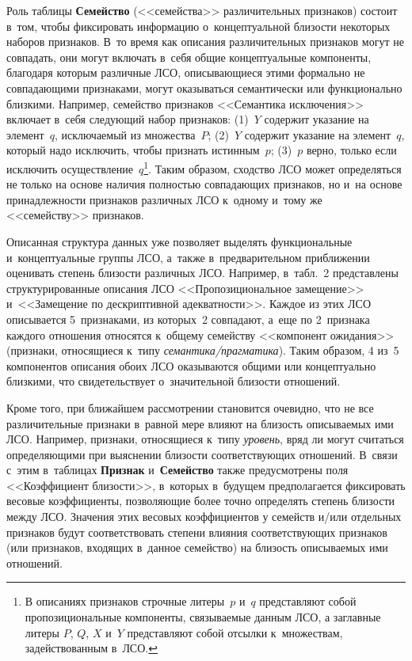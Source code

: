 \begin{multicols}{2}
Роль таблицы \textbf{Семейство} (<<семейства>> различительных признаков) 
состоит в~том, чтобы фиксировать информацию о~концептуальной бли\-зости 
некоторых наборов признаков. В~то время как \mbox{описания} различительных 
признаков могут не совпадать, они могут вклю\-чать в~себя общие 
концептуальные компоненты, благодаря которым различные ЛСО, 
описывающиеся этими формально не совпадающими признаками, могут 
оказываться семантически или функционально близкими. Например, 
семейство признаков <<Семантика исключения>> включает в~себя 
следующий набор признаков: 
(1)~$Y$ содержит указание на элемент~$q$, 
ис\-клю\-ча\-емый из множества~$P$; 
(2)~$Y$ содержит указание на элемент~$q$, 
который надо исключить, чтобы признать истинным~$p$; 
(3)~$p$ верно, 
только если исключить осуществление~$q$\footnote{В описаниях признаков 
строчные литеры~$p$ и~$q$ представляют собой пропозициональные компоненты, 
связываемые данным ЛСО, а заглавные литеры $P$, $Q$, $X$ и~$Y$ представляют 
собой отсылки к~множествам, задействованным в~ЛСО.}.
 Таким образом, сходство ЛСО может 
определяться не только на основе наличия пол\-ностью совпадающих 
признаков, но и~на основе принадлежности признаков различных ЛСО 
к~одному и~тому же <<семейству>> признаков.
   
   Описанная структура данных уже позволяет выделять функциональные 
   и~концептуальные группы ЛСО, а~так\-же в~предварительном при\-бли\-же\-нии 
оценивать степень бли\-зости различных ЛСО. Например, в~табл.~2 
представлены структурированные описания ЛСО <<Пропозициональное 
замещение>> и~<<Замещение по дескриптивной аде\-кват\-ности>>. Каждое из 
этих ЛСО описывается 5~признаками, из которых~2 совпадают, а~еще по 
2~признака каж\-до\-го отношения относятся к~общему семейству <<компонент 
ожидания>> (признаки, относящиеся к~типу \textit{се\-ман\-ти\-ка/праг\-ма\-ти\-ка}). 
Таким образом, 4 из~5 компонентов описания обоих ЛСО 
оказываются общими или концептуально близ\-ки\-ми, что свидетельствует 
о~значительной бли\-зости от\-но\-ше\-ний.
{

}
   
   Кроме того, при ближайшем рассмотрении становится очевидно, что не 
все различительные признаки в~равной мере влияют на близость опи\-сы\-ва\-емых 
ими ЛСО. Например, признаки, относящиеся к~типу \textit{уровень}, вряд ли 
могут считаться определяющими при выяснении близости соответствующих 
отношений. В~связи с~этим в~таблицах \textbf{Признак} и~\textbf{Семейство} 
также предусмотрены поля <<Коэффициент близости>>, в~которых в~будущем 
предполагается фиксировать весовые коэффициенты, позволяющие более 
точно определять степень близости между ЛСО. Значения этих весовых 
коэффициентов у семейств и/или отдельных признаков будут соответствовать 
степени влияния соответствующих признаков (или признаков, входящих 
в~данное семейство) на близость описываемых ими отношений.


\end{multicols}
